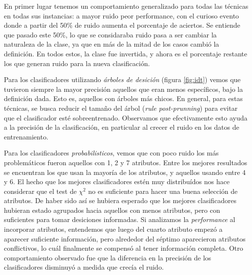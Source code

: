 \documentclass[a4paper,10pt]{article}
\begin{document}
En primer lugar tenemos un comportamiento generalizado para todas las técnicas en todas sus instancias: a mayor ruido peor performance, con el curioso evento donde a partir del 50\% de ruido aumenta el porcentaje de aciertos. Se entiende que pasado este 50\%, lo que se considaraba ruido pasa a ser cambiar la naturaleza de la clase, ya que en más de la mitad de los casos cambió la definición. En todos estos, la clase fue invertida, y ahora es el porcentaje restante los que generan ruido para la nueva clasificación.


Para los clasificadores utilizando \emph{árboles de desición} (figura \ref{fig:idt}) vemos que tuvieron siempre la mayor precisión aquellos que eran menos específicos, bajo la definición dada. Esto es, aquellos con árboles más chicos. En general, para estas técnicas, se busca reducir el tamaño del árbol (\emph{rule post-prunning}) para evitar que el clasificador esté sobreentrenado. Observamos que efectivamente esto ayuda a la precisión de la clasificación, en particular al crecer el ruido en los datos de entrenamiento.

Para los clasificadores \emph{probabilisticos}, vemos que con poco ruido los más problemáticos fueron aquellos con 1, 2 y 7 atributos. Entre los mejores resultados se encuentran los que usan la mayoría de los atributos, y aquellos usando entre 4 y 6. El hecho que los mejores clasificadores estén muy distribuídos nos hace considerar que el test de $\chi^2$ no es suficiente para hacer una buena selección de atributos. De haber sido así se hubiera esperado que los mejores clasificadores hubieran estado agrupados hacia aquellos con menos atributos, pero con suficientes para tomar desiciones informadas. Si analizamos la \emph{performance} al incorporar atributos, entendemos que luego del cuarto atributo empezó a aparecer suficiente información, pero alrededor del séptimo aparecieron atributos conflictivos, lo cuál finalmente se compensó al tener información completa. Otro comportamiento observado fue que la diferencia en la precisión de los clasificadores disminuyó a medida que crecía el ruido.
\end{document}
